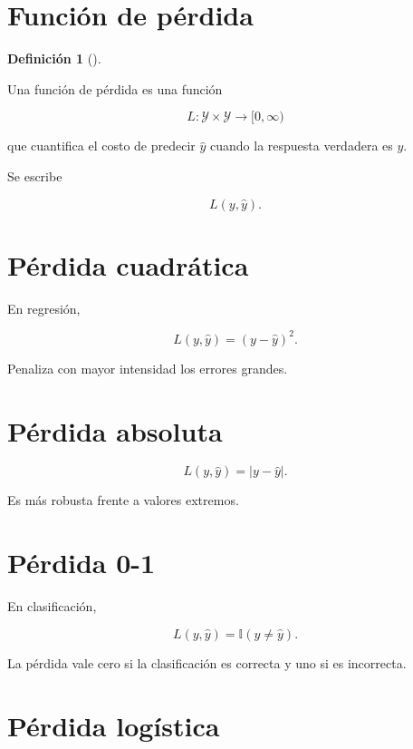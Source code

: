 \documentclass[
  spanish,
  11pt,
  letterpaper,
  DIV=11,
  numbers=noendperiod]{scrreprt}
\theoremstyle{definition}
\newtheorem{definition}{Definición}[chapter]
\theoremstyle{plain}
\theoremstyle{definition}
\theoremstyle{remark}
\begin{document}
\section{Función de pérdida}\label{funciuxf3n-de-puxe9rdida}

\begin{definition}[]\protect\hypertarget{def-funcion-perdida}{}\label{def-funcion-perdida}

Una función de pérdida es una función

\[
L:\mathcal{Y}\times\mathcal{Y}\to[0,\infty)
\]

que cuantifica el costo de predecir \(\widehat{y}\) cuando la respuesta
verdadera es \(y\).

\end{definition}

Se escribe

\[
L(y,\widehat{y}).
\]

\section{Pérdida cuadrática}\label{puxe9rdida-cuadruxe1tica-1}

En regresión,

\[
L(y,\widehat{y})
=
(y-\widehat{y})^2.
\]

Penaliza con mayor intensidad los errores grandes.

\section{Pérdida absoluta}\label{puxe9rdida-absoluta-1}

\[
L(y,\widehat{y})
=
|y-\widehat{y}|.
\]

Es más robusta frente a valores extremos.

\section{Pérdida 0-1}\label{puxe9rdida-0-1}

En clasificación,

\[
L(y,\widehat{y})
=
\mathbb{I}(y\neq\widehat{y}).
\]

La pérdida vale cero si la clasificación es correcta y uno si es
incorrecta.

\section{Pérdida logística}\label{puxe9rdida-loguxedstica-1}
\end{document}

